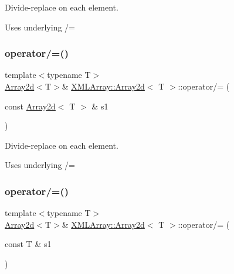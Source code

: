 Divide-\/replace on each element. 

Uses underlying /= \mbox{\label{classXMLArray_1_1Array2d_a704df3d7442ab68977e0caa8f8f059cd}} 
\subsubsection{\texorpdfstring{operator/=()}{operator/=()}\hspace{0.1cm}{\footnotesize\ttfamily [2/4]}}
{\footnotesize\ttfamily template$<$typename T$>$ \\
\mbox{\hyperlink{classXMLArray_1_1Array2d}{Array2d}}$<$T$>$\& \mbox{\hyperlink{classXMLArray_1_1Array2d}{X\+M\+L\+Array\+::\+Array2d}}$<$ T $>$\+::operator/= (\begin{DoxyParamCaption}\item[{const \mbox{\hyperlink{classXMLArray_1_1Array2d}{Array2d}}$<$ T $>$ \&}]{s1 }\end{DoxyParamCaption})\hspace{0.3cm}{\ttfamily [inline]}}



Divide-\/replace on each element. 

Uses underlying /= \mbox{\label{classXMLArray_1_1Array2d_aa699e2de82efb77e8e5e875a63eb7d8b}} 
\subsubsection{\texorpdfstring{operator/=()}{operator/=()}\hspace{0.1cm}{\footnotesize\ttfamily [3/4]}}
{\footnotesize\ttfamily template$<$typename T$>$ \\
\mbox{\hyperlink{classXMLArray_1_1Array2d}{Array2d}}$<$T$>$\& \mbox{\hyperlink{classXMLArray_1_1Array2d}{X\+M\+L\+Array\+::\+Array2d}}$<$ T $>$\+::operator/= (\begin{DoxyParamCaption}\item[{const T \&}]{s1 }\end{DoxyParamCaption})\hspace{0.3cm}{\ttfamily [inline]}}




